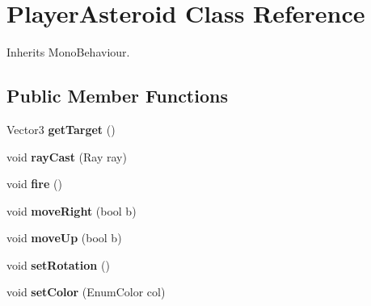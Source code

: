 \hypertarget{class_player_asteroid}{\section{Player\-Asteroid Class Reference}
\label{class_player_asteroid}
}


Inherits Mono\-Behaviour.

\subsection*{Public Member Functions}
\begin{DoxyCompactItemize}
\item 
\hypertarget{class_player_asteroid_ac5e38be5ea543755ec052e70593755bc}{Vector3 {\bfseries get\-Target} ()}\label{class_player_asteroid_ac5e38be5ea543755ec052e70593755bc}

\item 
\hypertarget{class_player_asteroid_a5a7035b82f35cdfbeea2f9314852f626}{void {\bfseries ray\-Cast} (Ray ray)}\label{class_player_asteroid_a5a7035b82f35cdfbeea2f9314852f626}

\item 
\hypertarget{class_player_asteroid_a8c72e34661b32f7772cd9162a96ad4b7}{void {\bfseries fire} ()}\label{class_player_asteroid_a8c72e34661b32f7772cd9162a96ad4b7}

\item 
\hypertarget{class_player_asteroid_a033ba5db753e9bf0e2ba947a4acdb6b6}{void {\bfseries move\-Right} (bool b)}\label{class_player_asteroid_a033ba5db753e9bf0e2ba947a4acdb6b6}

\item 
\hypertarget{class_player_asteroid_a3fd8fdf2f0ad260c8d3f4ce6af1c5582}{void {\bfseries move\-Up} (bool b)}\label{class_player_asteroid_a3fd8fdf2f0ad260c8d3f4ce6af1c5582}

\item 
\hypertarget{class_player_asteroid_a78865c78bd1a349336ffab3f9ce8bb74}{void {\bfseries set\-Rotation} ()}\label{class_player_asteroid_a78865c78bd1a349336ffab3f9ce8bb74}

\item 
\hypertarget{class_player_asteroid_ac712c3f55475e68fdaff9d79a8ac2222}{void {\bfseries set\-Color} (Enum\-Color col)}\label{class_player_asteroid_ac712c3f55475e68fdaff9d79a8ac2222}

\end{DoxyCompactItemize}
